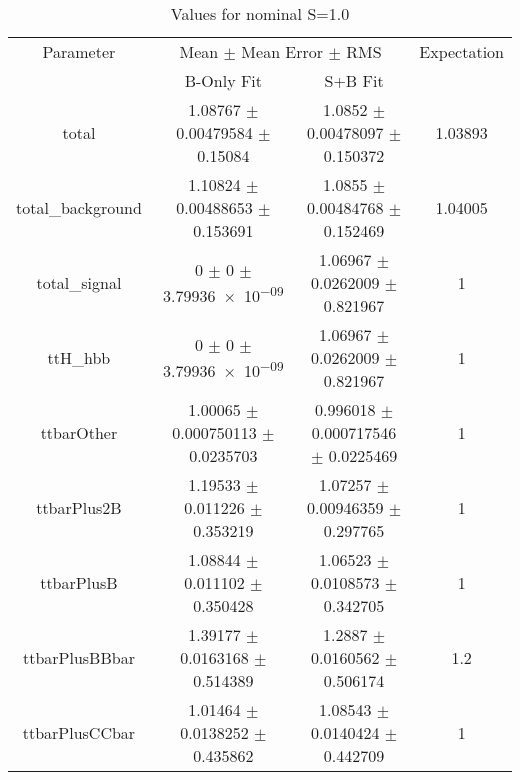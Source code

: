 \begin{table}
\centering
\caption{Values for nominal S=1.0}
\begin{tabular}{cccc}
\toprule
Parameter & \multicolumn{2}{c}{Mean $\pm$ Mean Error $\pm$ RMS} & Expectation\\
 & B-Only Fit & S+B Fit & \\
\midrule
total & \num{1.08767} $\pm$ \num{0.00479584} $\pm$ \num{0.15084} & \num{1.0852} $\pm$ \num{0.00478097} $\pm$ \num{0.150372} & \num{1.03893}\\
total\_background & \num{1.10824} $\pm$ \num{0.00488653} $\pm$ \num{0.153691} & \num{1.0855} $\pm$ \num{0.00484768} $\pm$ \num{0.152469} & \num{1.04005}\\
total\_signal & \num{0} $\pm$ \num{0} $\pm$ \num{3.79936e-09} & \num{1.06967} $\pm$ \num{0.0262009} $\pm$ \num{0.821967} & \num{1}\\
ttH\_hbb & \num{0} $\pm$ \num{0} $\pm$ \num{3.79936e-09} & \num{1.06967} $\pm$ \num{0.0262009} $\pm$ \num{0.821967} & \num{1}\\
ttbarOther & \num{1.00065} $\pm$ \num{0.000750113} $\pm$ \num{0.0235703} & \num{0.996018} $\pm$ \num{0.000717546} $\pm$ \num{0.0225469} & \num{1}\\
ttbarPlus2B & \num{1.19533} $\pm$ \num{0.011226} $\pm$ \num{0.353219} & \num{1.07257} $\pm$ \num{0.00946359} $\pm$ \num{0.297765} & \num{1}\\
ttbarPlusB & \num{1.08844} $\pm$ \num{0.011102} $\pm$ \num{0.350428} & \num{1.06523} $\pm$ \num{0.0108573} $\pm$ \num{0.342705} & \num{1}\\
ttbarPlusBBbar & \num{1.39177} $\pm$ \num{0.0163168} $\pm$ \num{0.514389} & \num{1.2887} $\pm$ \num{0.0160562} $\pm$ \num{0.506174} & \num{1.2}\\
ttbarPlusCCbar & \num{1.01464} $\pm$ \num{0.0138252} $\pm$ \num{0.435862} & \num{1.08543} $\pm$ \num{0.0140424} $\pm$ \num{0.442709} & \num{1}\\
\bottomrule
\end{tabular}
\end{table}